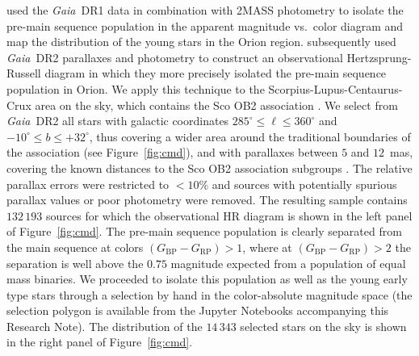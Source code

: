 \documentclass[RNAAS]{aastex62}
\newcommand\gaia{\textit{Gaia}}
\newcommand\gdr[1]{\gaia~DR#1}
\begin{document}
\cite{Zari17} used the \gdr{1} \citep{Prusti16,Brown16} data in combination with 2MASS photometry \citep{Skrutskie06} to isolate the pre-main sequence population in the apparent magnitude vs.\ color diagram and map the distribution of the young stars in the Orion region.
\cite{Kounkel18} subsequently used \gdr{2} \citep{Brown18} parallaxes and photometry to construct an observational Hertzsprung-Russell diagram in which they more precisely isolated the pre-main sequence population in Orion.
%
We apply this technique to the Scorpius-Lupus-Centaurus-Crux area on the sky, which contains the Sco OB2 association \citep{Blaauw46}. We select from \gdr{2} all stars with galactic coordinates $285^\circ\leq\ell\leq360^\circ$ and $-10^\circ\leq b\leq+32^\circ$, thus covering a wider area around the traditional boundaries of the association (see Figure~\ref{fig:cmd}), and with parallaxes between $5$ and $12$~mas, covering the known distances to the Sco OB2 association subgroups \citep{Wright18}. The relative parallax errors were restricted to $<10\%$ and sources with potentially spurious parallax values or poor photometry \citep[Appendix C of][]{Lindegren18} were removed. The resulting sample contains $132\,193$ sources for which the observational HR diagram is shown in the left panel of Figure~\ref{fig:cmd}. The pre-main sequence population is clearly separated from the main sequence at colors $(G_\mathrm{BP}-G_\mathrm{RP})>1$, where at $(G_\mathrm{BP}-G_\mathrm{RP})>2$ the separation is well above the $0.75$ magnitude expected from a population of equal mass binaries. We proceeded to isolate this population as well as the young early type stars through a selection by hand in the color-absolute magnitude space (the selection polygon is available from the Jupyter Notebooks accompanying this Research Note). The distribution of the $14\,343$ selected stars on the sky is shown in the right panel of Figure~\ref{fig:cmd}. 
\end{document}

